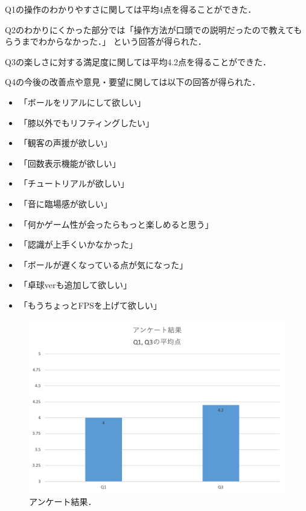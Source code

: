 Q1の操作のわかりやすさに関しては平均4点を得ることができた．

Q2のわかりにくかった部分では「操作方法が口頭での説明だったので教えてもらうまでわからなかった．」
という回答が得られた．

Q3の楽しさに対する満足度に関しては平均4.2点を得ることができた．

Q4の今後の改善点や意見・要望に関しては以下の回答が得られた．
\begin{itemize}
  \item 「ボールをリアルにして欲しい」
  \item 「膝以外でもリフティングしたい」
  \item 「観客の声援が欲しい」
  \item 「回数表示機能が欲しい」
  \item 「チュートリアルが欲しい」
  \item 「音に臨場感が欲しい」
  \item 「何かゲーム性が会ったらもっと楽しめると思う」
  \item 「認識が上手くいかなかった」
  \item 「ボールが遅くなっている点が気になった」
  \item 「卓球verも追加して欲しい」
  \item 「もうちょっとFPSを上げて欲しい」
\end{itemize}


\begin{figure}[p]
  \centering
  \includegraphics[width=12cm]{image/ave.png}
  \caption[アンケート結果]{アンケート結果．}
\label{hyouka}
\end{figure}
